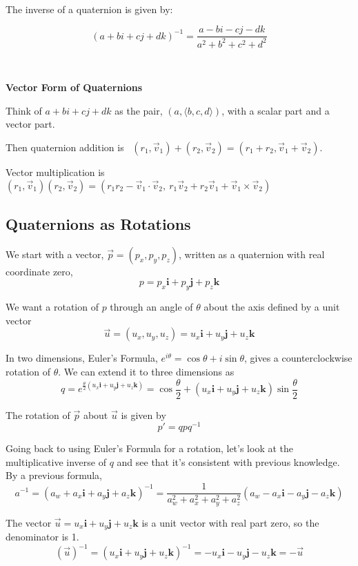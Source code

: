 \

The inverse of a quaternion is given by:

$$ (a + bi + cj + dk)^{-1} = \frac{a - bi - cj - dk}{a^2 + b^2 + c^2 + d^2}$$

\

{\bf Vector Form of Quaternions}

Think of $a + bi + cj + dk$ as the pair, $(a, \langle b,c,d \rangle )$, with a scalar part and a vector part.  

Then quaternion addition is \ $(r_1, \vec{v}_1) + (r_2, \vec{v}_2) = (r_1 + r_2, \vec{v}_1 + \vec{v}_2)$.

Vector multiplication is $(r_1,\vec{v}_1) (r_2,\vec{v}_2) = (r_1r_2 - \vec{v}_1 \cdot \vec{v}_2, \ r_1\vec{v}_2 + r_2 \vec{v}_1 + \vec{v}_1 \times \vec{v}_2)$


\subsection{Quaternions as Rotations}

We start with a vector, $\vec{p} = (p_x, p_y, p_z)$, written as a quaternion with real coordinate zero, 
$$p = p_x \mathbf{i} + p_y \mathbf{j} + p_z \mathbf{k}$$

We want a rotation of $p$ through an angle of $\theta$ about the axis defined by a unit vector $$\vec{u} =  ( u_x, u_y, u_z ) = u_x \mathbf{i} + u_y \mathbf{j} + u_z \mathbf{k}$$ 

In two dimensions, Euler's Formula,  $e^{i\theta} = \cos \theta + i \sin \theta$, gives a counterclockwise rotation of $\theta$.  We can extend it to three dimensions as
$$q = e^{ 
	\frac{\theta}{2}
	( u_x \mathbf{i} + u_y \mathbf{j} + u_z \mathbf{k} )
	}
=
	\cos \frac{\theta}{2} + ( u_x \mathbf{i} + u_y \mathbf{j} + u_z \mathbf{k} ) \sin \frac{\theta}{2}
$$

The rotation of $\vec{p}$ about $\vec{u}$ is given by 
$$p' = q p q^{-1}$$

Going back to using Euler's Formula for a rotation, let's look at the multiplicative inverse of $q$ and see that it's consistent with previous knowledge.  By a previous formula, 
$$a^{-1} = (a_w + a_x \mathbf{i} + a_y \mathbf{j} + a_z \mathbf{k})^{-1} = 
\frac{1}{a_w^2 + a_x^2 + a_y^2 + a_z^2} (a_w - a_x \mathbf{i} - a_y \mathbf{j} - a_z \mathbf{k} )$$

The vector $\vec{u} = u_x \mathbf{i} + u_y \mathbf{j} + u_z \mathbf{k}$ is a unit vector with real part zero, so the denominator is 1.  
$$(\vec{u})^{-1} = (u_x \mathbf{i} + u_y \mathbf{j} + u_z \mathbf{k})^{-1} = -u_x \mathbf{i} - u_y \mathbf{j} - u_z \mathbf{k} = -\vec{u}$$

